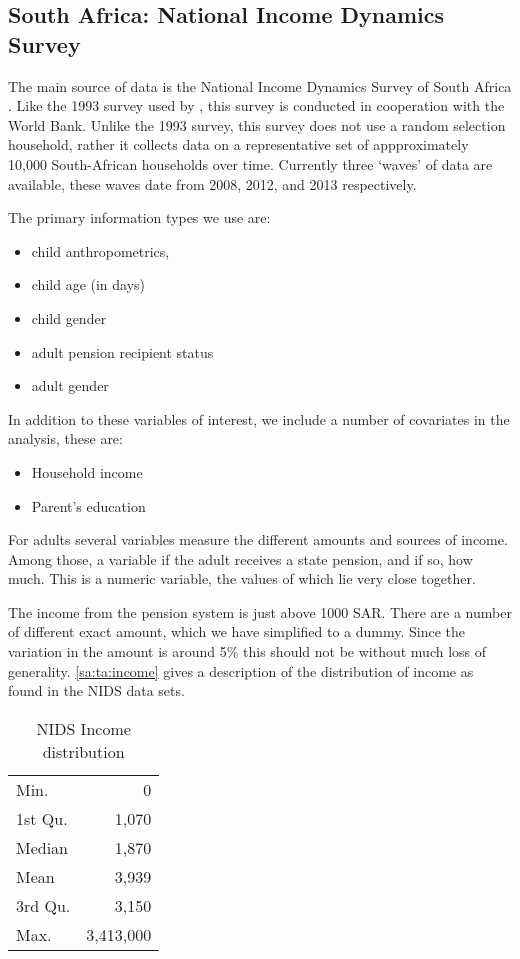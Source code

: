 \begin{refsection}
\subsection{South Africa: National Income Dynamics Survey}
The main source of data is the National Income Dynamics Survey of South Africa \parencite{saldru2008nids, saldru2012nids, saldru2013nids}.
Like the 1993 survey used by \textcite{duflo2000child, duflo2003grandmothers}, this survey is conducted in cooperation with the World Bank.
Unlike the 1993 survey, this survey does not use a random selection household,
rather it collects data on a representative set of appproximately 10,000 South-African households over time.
Currently three `waves' of data are available, these waves date from 2008, 2012, and 2013 respectively.

The primary information types we use are:
\begin{itemize}
  \item child anthropometrics,
  \item child age (in days)
  \item child gender
  \item adult pension recipient status
  \item adult gender
\end{itemize}
In addition to these variables of interest, we include a number of covariates in the analysis, these are:
\begin{itemize}
  \item Household income
  \item Parent's education
\end{itemize}

For adults several variables measure the different amounts and sources of income.
Among those, a variable if the adult receives a state pension, and if so, how much.
This is a numeric variable, the values of which lie very close together.

The income from the pension system is just above 1000 SAR.
There are a number of different exact amount, which we have simplified to a dummy.
Since the variation in the amount is around 5\% this should not be without much loss of generality.
\autoref{sa:ta:income} gives a description of the distribution of income as found in the NIDS data sets.

\begin{table}[hb!]
\centering
\caption{NIDS Income distribution}
\label{sa:ta:income}
\begin{tabular}{l|r}
\hline
  Min. & 0 \\
  1st Qu. & 1,070 \\
  Median & 1,870 \\
  Mean & 3,939 \\
  3rd Qu. & 3,150 \\
  Max. & 3,413,000 \\
\end{tabular}
\end{table}


\end{refsection}
